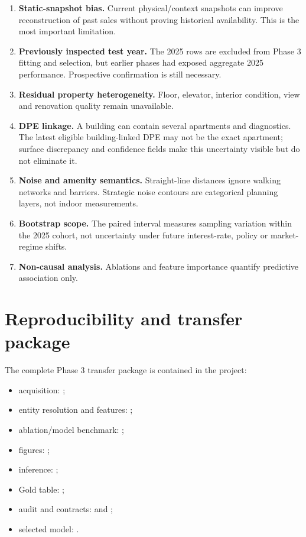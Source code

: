 \documentclass[11pt,a4paper]{article}
\begin{document}
\begin{enumerate}
  \item \textbf{Static-snapshot bias.} Current physical/context snapshots can
  improve reconstruction of past sales without proving historical availability.
  This is the most important limitation.
  \item \textbf{Previously inspected test year.} The 2025 rows are excluded
  from Phase 3 fitting and selection, but earlier phases had exposed aggregate
  2025 performance. Prospective confirmation is still necessary.
  \item \textbf{Residual property heterogeneity.} Floor, elevator, interior
  condition, view and renovation quality remain unavailable.
  \item \textbf{DPE linkage.} A building can contain several apartments and
  diagnostics. The latest eligible building-linked DPE may not be the exact
  apartment; surface discrepancy and confidence fields make this uncertainty
  visible but do not eliminate it.
  \item \textbf{Noise and amenity semantics.} Straight-line distances ignore
  walking networks and barriers. Strategic noise contours are categorical
  planning layers, not indoor measurements.
  \item \textbf{Bootstrap scope.} The paired interval measures sampling
  variation within the 2025 cohort, not uncertainty under future interest-rate,
  policy or market-regime shifts.
  \item \textbf{Non-causal analysis.} Ablations and feature importance quantify
  predictive association only.
\end{enumerate}

\section{Reproducibility and transfer package}

The complete Phase 3 transfer package is contained in the project:
\begin{itemize}
  \item acquisition: ;
  \item entity resolution and features: ;
  \item ablation/model benchmark: ;
  \item figures: ;
  \item inference: ;
  \item Gold table: ;
  \item audit and contracts:  and
  ;
  \item selected model: .
\end{itemize}
\end{document}

